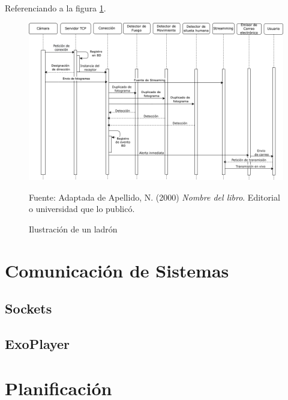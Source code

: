 Referenciando a la figura \ref{fig:ejemplo}.
\begin{figure}[H]
    \begin{center}
        \includegraphics[width=18cm]{img/capitulo_4/interaccion.png}
    \end{center}
    \caption{Ilustración de un ladrón}
    Fuente: Adaptada de Apellido, N. (2000) \textit{Nombre del libro}.
    Editorial o universidad que lo publicó.
    \label{fig:ejemplo}
\end{figure}
\section{Comunicación de Sistemas}
\subsection{Sockets}

\subsection{ExoPlayer}

\section{Planificación}

